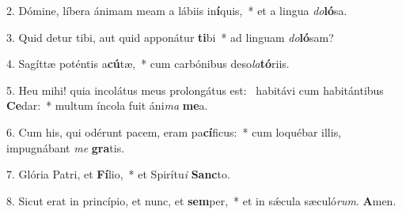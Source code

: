2. Dómine, líbera ánimam meam a lábiis in\textbf{í}quis,~*  et a lingua \textit{do}\textbf{ló}sa.\

3. Quid detur tibi, aut quid apponátur \textbf{ti}bi~*  ad linguam \textit{do}\textbf{ló}sam?\

4. Sagíttæ poténtis a\textbf{cú}tæ,~*  cum carbónibus deso\textit{la}\textbf{tó}riis.\

5. Heu mihi! quia incolátus meus prolongátus est: \dag\  habitávi cum habitántibus \textbf{Ce}dar:~*  multum íncola fuit áni\textit{ma} \textbf{me}a.\

6. Cum his, qui odérunt pacem, eram pa\textbf{cí}ficus:~*  cum loquébar illis, impugnábant \textit{me} \textbf{gra}tis.\

7. Glória Patri, et \textbf{Fí}lio,~*  et Spirítu\textit{i} \textbf{Sanc}to.\

8. Sicut erat in princípio, et nunc, et \textbf{sem}per,~*  et in sǽcula sæculó\textit{rum}. \textbf{A}men.\

